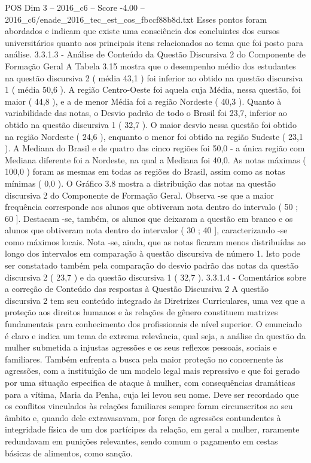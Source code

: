 \begin{textsample}{POS Dim 3 – 2016\_c6 – Score -4.00 – 2016\_c6/enade\_2016\_tec\_est\_cos\_fbccf88b8d.txt}
Esses pontos foram abordados e indicam que existe uma consciência dos concluintes dos cursos universitários quanto aos principais itens relacionados ao tema que foi posto para análise. 3.3.1.3 - Análise de Conteúdo da Questão Discursiva 2 do Componente de Formação Geral A Tabela 3.15 mostra que o desempenho médio dos estudantes na questão discursiva 2 ( média 43,1 ) foi inferior ao obtido na questão discursiva 1 ( média 50,6 ).
A região Centro-Oeste foi aquela cuja Média, nessa questão, foi maior ( 44,8 ), e a de menor Média foi a região Nordeste ( 40,3 ).
Quanto à variabilidade das notas, o Desvio padrão de todo o Brasil foi 23,7, inferior ao obtido na questão discursiva 1 ( 32,7 ).
O maior desvio nessa questão foi obtido na região Nordeste ( 24,6 ), enquanto o menor foi obtido na região Sudeste ( 23,1 ).
A Mediana do Brasil e de quatro das cinco regiões foi 50,0 - a única região com Mediana diferente foi a Nordeste, na qual a Mediana foi 40,0.
As notas máximas ( 100,0 ) foram as mesmas em todas as regiões do Brasil, assim como as notas mínimas ( 0,0 ).
O Gráfico 3.8 mostra a distribuição das notas na questão discursiva 2 do Componente de Formação Geral.
Observa -se que a maior frequência corresponde aos alunos que obtiveram nota dentro do intervalo ( 50 ; 60 ].
Destacam -se, também, os alunos que deixaram a questão em branco e os alunos que obtiveram nota dentro do intervalor ( 30 ; 40 ], caracterizando -se como máximos locais.
Nota -se, ainda, que as notas ficaram menos distribuídas ao longo dos intervalos em comparação à questão discursiva de número 1.
Isto pode ser constatado também pela comparação do desvio padrão das notas da questão discursiva 2 ( 23,7 ) e da questão discursiva 1 ( 32,7 ). 3.3.1.4 - Comentários sobre a correção de Conteúdo das respostas à Questão Discursiva 2 A questão discursiva 2 tem seu conteúdo integrado às Diretrizes Curriculares, uma vez que a proteção aos direitos humanos e às relações de gênero constituem matrizes fundamentais para conhecimento dos profissionais de nível superior.
O enunciado é claro e indica um tema de extrema relevância, qual seja, a análise da questão da mulher submetida a injustas agressões e os seus reflexos pessoais, sociais e familiares.
Também enfrenta a busca pela maior proteção no concernente às agressões, com a instituição de um modelo legal mais repressivo e que foi gerado por uma situação especifica de ataque à mulher, com consequências dramáticas para a vítima, Maria da Penha, cuja lei levou seu nome.
Deve ser recordado que os conflitos vinculados às relações familiares sempre foram circunscritos ao seu âmbito e, quando dele extravasavam, por força de agressões contundentes à integridade física de um dos partícipes da relação, em geral a mulher, raramente redundavam em punições relevantes, sendo comum o pagamento em cestas básicas de alimentos, como sanção.

\end{textsample}
